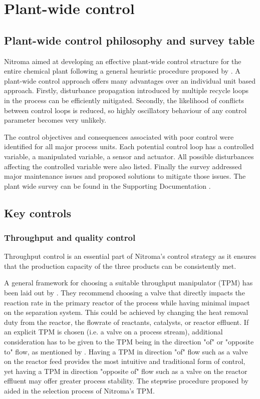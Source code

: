 \section{Plant-wide control}


\subsection{Plant-wide control philosophy and survey table} %

Nitroma aimed at developing an effective plant-wide control structure for the entire chemical plant following a general heuristic procedure proposed by \textcite{}. A plant-wide control approach offers many advantages over an individual unit based approach. Firstly, disturbance propagation introduced by multiple recycle loops in the process can be efficiently mitigated. Secondly, the likelihood of conflicts between control loops is reduced, so highly oscillatory behaviour of any control parameter becomes very unlikely. 

The control objectives and consequences associated with poor control were identified for all major process units. Each potential control loop has a controlled variable, a manipulated variable, a sensor and actuator. All possible disturbances affecting the controlled variable were also listed. Finally the survey addressed major maintenance issues and proposed solutions to mitigate those issues. The plant wide survey can be found in the Supporting Documentation .


\subsection{Key controls}

\subsubsection{Throughput and quality control} %
Throughput control is an essential part of Nitroma's control strategy as it ensures that the production capacity of the three products can be consistently met.

A general framework for choosing a suitable throughput manipulator (TPM) has been laid out by \textcite{}. They recommend choosing a valve that directly impacts the reaction rate in the primary reactor of the process while having minimal impact on the separation system. This could be achieved by changing the heat removal duty from the reactor, the flowrate of reactants, catalysts, or reactor effluent. If an explicit TPM  is chosen (i.e. a valve on a process stream), additional consideration has to be given to the TPM being in the direction "of" or "opposite to" flow, as mentioned by \textcite{}. Having a TPM in direction "of" flow such as a valve on the reactor feed provides the most intuitive and traditional form of control, yet having a TPM in direction "opposite of" flow such as a valve on the reactor effluent may offer greater process stability. The stepwise procedure proposed by \textcite{} aided in the selection process of Nitroma's TPM. 

